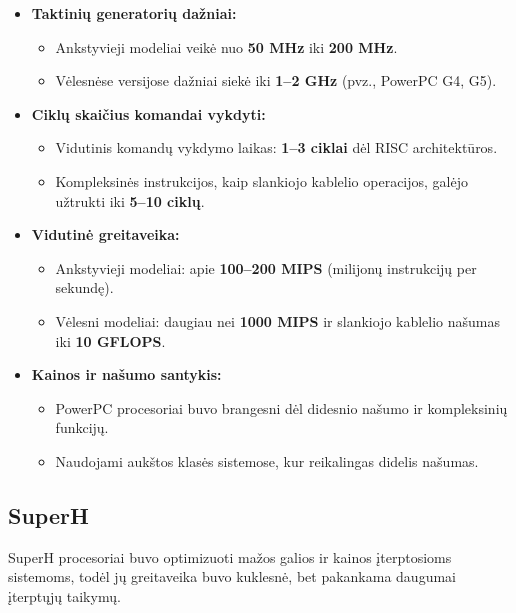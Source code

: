 \documentclass{article}
\begin{document}
\begin{itemize}
    \item \textbf{Taktinių generatorių dažniai:}
        \begin{itemize}
            \item Ankstyvieji modeliai veikė nuo \textbf{50 MHz} iki \textbf{200 MHz}.
            \item Vėlesnėse versijose dažniai siekė iki \textbf{1–2 GHz} (pvz., PowerPC G4, G5).
        \end{itemize}
    \item \textbf{Ciklų skaičius komandai vykdyti:}
        \begin{itemize}
            \item Vidutinis komandų vykdymo laikas: \textbf{1–3 ciklai} dėl RISC architektūros.
            \item Kompleksinės instrukcijos, kaip slankiojo kablelio operacijos, galėjo užtrukti iki \textbf{5–10 ciklų}.
        \end{itemize}
    \item \textbf{Vidutinė greitaveika:}
        \begin{itemize}
            \item Ankstyvieji modeliai: apie \textbf{100–200 MIPS} (milijonų instrukcijų per sekundę).
            \item Vėlesni modeliai: daugiau nei \textbf{1000 MIPS} ir slankiojo kablelio našumas iki \textbf{10 GFLOPS}.
        \end{itemize}
    \item \textbf{Kainos ir našumo santykis:}
        \begin{itemize}
            \item PowerPC procesoriai buvo brangesni dėl didesnio našumo ir kompleksinių funkcijų.
            \item Naudojami aukštos klasės sistemose, kur reikalingas didelis našumas.
        \end{itemize}
\end{itemize}

\subsection{SuperH}
SuperH procesoriai buvo optimizuoti mažos galios ir kainos įterptosioms sistemoms, todėl jų greitaveika buvo kuklesnė, bet pakankama daugumai įterptųjų taikymų.
\end{document}
